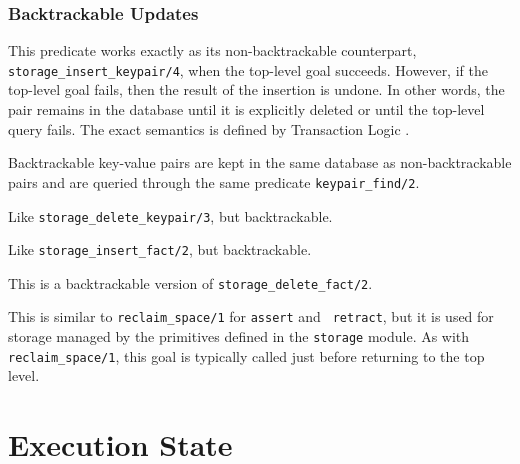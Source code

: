 \subsubsection{Backtrackable Updates}
\label{backtrackable update}

\begin{description}
This predicate works exactly as its non-backtrackable counterpart,
{\tt storage\_insert\_keypair/4}, when the top-level goal succeeds.
However, if the top-level goal fails, then the result of the insertion is
undone. In other words, the pair remains in the database until it is
explicitly deleted or until the top-level query fails. The exact semantics
is defined by Transaction Logic \cite{BoKi94}.

Backtrackable key-value pairs are kept in the same database as
non-backtrackable pairs and are queried through the same predicate
{\tt keypair\_find/2}.

Like {\tt storage\_delete\_keypair/3}, but backtrackable.


 
Like {\tt storage\_insert\_fact/2}, but backtrackable.

This is a backtrackable version of {\tt storage\_delete\_fact/2}.

 
This is similar to {\tt reclaim\_space/1} for {\tt assert} and {\tt
  retract}, but it is used for storage managed by the primitives defined in
the {\tt storage} module. As with {\tt reclaim\_space/1}, this goal is
typically called just before returning to the top level.
\end{description}



\section{Execution State}\label{environmental}

